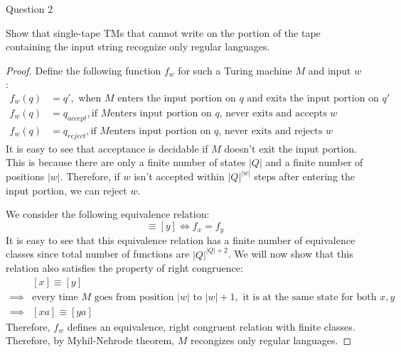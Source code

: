 \begin{solution}{Question 2}\label{ques:2}
    \begin{question}
        Show that single-tape TMs that cannot write on the portion of the tape containing the input string recognize only regular languages.
    \end{question}
    \tcblower{}
    \begin{proof}
        Define the following function $f_w$ for such a Turing machine $M$ and input $w$:
        \begin{equation}
          \begin{split}
            f_w(q) &= q',\text{ when }M\text{ enters the input portion on }q\text{ and exits the input portion on }q'\\
            f_w(q) &= q_{accept},\text{if }M\text{enters input portion on }q\text{, never exits and accepts }w\\
            f_w(q) &= q_{reject},\text{if }M\text{enters input portion on }q\text{, never exits and rejects }w
          \end{split}
        \end{equation}
        It is easy to see that acceptance is decidable if $M$ doesn't exit the input portion. This is because there are only a finite number of states $|Q|$ and a finite number of positions $|w|$. Therefore, if $w$ isn't accepted within $|Q|^{|w|}$ steps after entering the input portion, we can reject $w$.\par
        We consider the following equivalence relation:
        \begin{equation}
          [x] \equiv [y] \iff f_x = f_y
        \end{equation}
        It is easy to see that this equivalence relation has a finite number of equivalence classes since total number of functions are $|Q|^{|Q|+2}$. We will now show that this relation also satisfies the property of right congruence:
        \begin{equation}
          \begin{split}
            &[x] \equiv [y] \\
            \implies &\text{every time }M\text{ goes from position }|w|\text{ to }|w|+1,\text{ it is at the same state for both }x, y\\
            \implies &[xa] \equiv [ya]
          \end{split}
        \end{equation}
        Therefore, $f_w$ defines an equivalence, right congruent relation with finite classes. Therefore, by Myhil-Nehrode theorem, $M$ recongizes only regular languages.
    \end{proof}
\end{solution}

